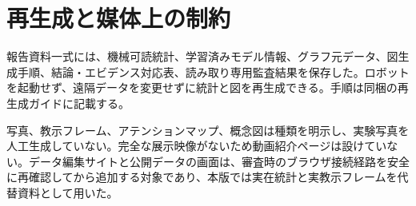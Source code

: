 \section{再生成と媒体上の制約}

報告資料一式には、機械可読統計、学習済みモデル情報、グラフ元データ、図生成手順、結論・エビデンス対応表、読み取り専用監査結果を保存した。ロボットを起動せず、遠隔データを変更せずに統計と図を再生成できる。手順は同梱の再生成ガイドに記載する。

写真、教示フレーム、アテンションマップ、概念図は種類を明示し、実験写真を人工生成していない。完全な展示映像がないため動画紹介ページは設けていない。データ編集サイトと公開データの画面は、審査時のブラウザ接続経路を安全に再確認してから追加する対象であり、本版では実在統計と実教示フレームを代替資料として用いた。
